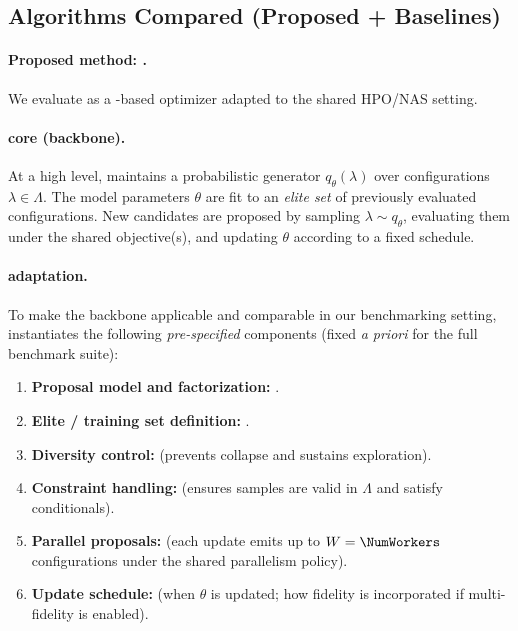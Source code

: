 \subsection{Algorithms Compared (Proposed + Baselines)}
\label{subsec:algorithms}

\paragraph{Proposed method: \ProposedMethodName{}.}
We evaluate \ProposedMethodName{} as a \BackboneName{}-based optimizer adapted to the shared HPO/NAS setting.
\NetAdaptationMeaning{}

\paragraph{\BackboneName{} core (backbone).}
\PThreeCoreDetails{}
At a high level, \BackboneName{} maintains a probabilistic generator \(q_{\theta}(\lambda)\) over configurations \(\lambda \in \Lambda\).
The model parameters \(\theta\) are fit to an \emph{elite set} of previously evaluated configurations.
New candidates are proposed by sampling \(\lambda \sim q_{\theta}\), evaluating them under the shared objective(s), and updating \(\theta\)
according to a fixed schedule.

\paragraph{\ProposedMethodName{} adaptation.}
\PThreeNetDetails{}
To make the backbone applicable and comparable in our benchmarking setting, \ProposedMethodName{} instantiates the following
\emph{pre-specified} components (fixed \emph{a priori} for the full benchmark suite):
\begin{enumerate}
    \item \textbf{Proposal model and factorization:} \PThreeProposalModel{}.
    \item \textbf{Elite / training set definition:} \PThreeSelectionRule{}.
    \item \textbf{Diversity control:} \PThreeDiversityRule{} (prevents collapse and sustains exploration).
    \item \textbf{Constraint handling:} \PThreeConstraintHandling{} (ensures samples are valid in \(\Lambda\) and satisfy conditionals).
    \item \textbf{Parallel proposals:} \PThreeBatchingParallelism{} (each update emits up to \(W=\NumWorkers\) configurations under the shared parallelism policy).
    \item \textbf{Update schedule:} \PThreeUpdateSchedule{} (when \(\theta\) is updated; how fidelity is incorporated if multi-fidelity is enabled).
\end{enumerate}

